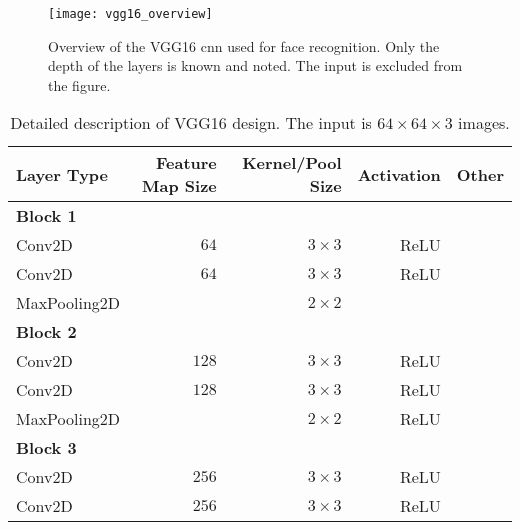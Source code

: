 \begin{figure}[H]
	\centering
	\texttt{[image: vgg16\_overview]}
	\caption{Overview of the VGG16 \gls{cnn} used for face recognition. Only the depth of the layers is known and noted. The input is excluded from the figure.}
	\label{fig:vgg16}
\end{figure}

\begin{table}[H]
	\centering
	\caption{Detailed description of VGG16 design. The input is $64\times64\times3$ images.}
	\label{tab:vgg16}
	\begin{tabular}{lrrrr}
		\textbf{Layer Type}     & \textbf{Feature Map Size} & \textbf{Kernel/Pool Size} & \textbf{Activation} & \textbf{Other} \\ \hline
		\textbf{Block 1}        &                           &                           &                     &                \\
		\rowcolor{lightGrey}  
		Conv2D                  & $64$                      & $3\times3$                & ReLU                &                \\
		Conv2D                  & $64$                      & $3\times3$                & ReLU                &                \\
		\rowcolor{lightGrey} 
		MaxPooling2D            &                           & $2\times2$                &                     &                \\
		\textbf{Block 2}        &                           &                           &                     &                \\
		\rowcolor{lightGrey}  
		Conv2D                  & $128$                     & $3\times3$                & ReLU                &                \\
		Conv2D                  & $128$                     & $3\times3$                & ReLU                &                \\
		\rowcolor{lightGrey}  
		MaxPooling2D            &                       &    $2\times2$             & ReLU                &                \\
		\textbf{Block 3}        &                           &                           &                     &                \\
		\rowcolor{lightGrey}  
		Conv2D                  & $256$                     & $3\times3$                & ReLU                &                \\
		Conv2D                  & $256$                     & $3\times3$                & ReLU                &                \\

\end{tabular}
\end{table}
